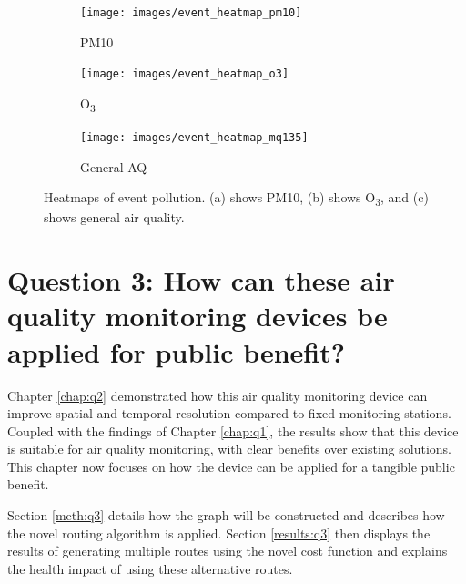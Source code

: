 \documentclass[11pt]{report}
\begin{document}
\begin{figure}[!tb]
    \centering
    \begin{minipage}{1\linewidth}
            \begin{subfigure}[t]{.5\linewidth}
                \texttt{[image: images/event\_heatmap\_pm10]}
                \caption{PM10}
                \label{fig:event_heatmap_pm10}
            \end{subfigure}
            \begin{subfigure}[t]{.5\linewidth}
            	\texttt{[image: images/event\_heatmap\_o3]}
            	\caption{O\textsubscript{3}}
            	\label{fig:event_heatmap_o3}
	   \end{subfigure}
        \end{minipage}
    \begin{minipage}{1\linewidth}
    	\centering
            \begin{subfigure}[t]{.5\linewidth}
                \texttt{[image: images/event\_heatmap\_mq135]}
                \caption{General AQ}
                \label{fig:event_heatmap_mq135}
            \end{subfigure}
        \end{minipage}
    \caption[Heatmaps of event pollution.]{Heatmaps of event pollution. (a) shows PM10, (b) shows O\textsubscript{3}, and (c) shows general air quality.}
    \label{fig:event_heatmaps}
\end{figure}





\chapter{Question 3: How can these air quality monitoring devices be applied for public benefit?} \label{chap:q3}

Chapter \ref{chap:q2} demonstrated how this air quality monitoring device can improve spatial and temporal resolution compared to fixed monitoring stations. Coupled with the findings of Chapter \ref{chap:q1}, the results show that this device is suitable for air quality monitoring, with clear benefits over existing solutions. This chapter now focuses on how the device can be applied for a tangible public benefit.

Section \ref{meth:q3} details how the graph will be constructed and describes how the novel routing algorithm is applied. Section \ref{results:q3} then displays the results of generating multiple routes using the novel cost function and explains the health impact of using these alternative routes.
\end{document}
